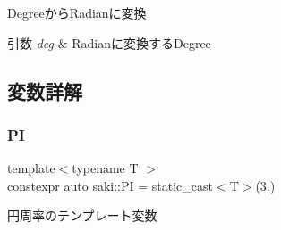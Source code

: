 Degreeから\+Radianに変換 


\begin{DoxyParams}{引数}
{\em deg} & Radianに変換する\+Degree \\
\hline
\end{DoxyParams}


\subsection{変数詳解}
\mbox{\label{namespacesaki_a1e4c737224df004cb65f178577838f0c}} 
\subsubsection{\texorpdfstring{PI}{PI}}
{\footnotesize\ttfamily template$<$typename T $>$ \\
constexpr auto saki\+::\+PI = static\+\_\+cast$<$T$>$(3.)}



円周率のテンプレート変数 

